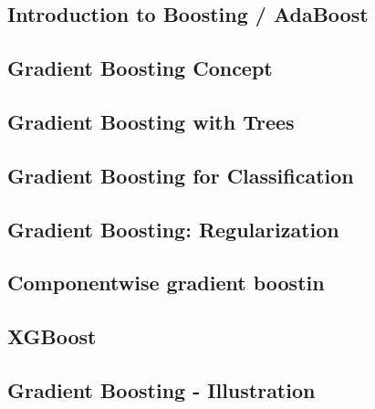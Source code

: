 


\subsection{Introduction to Boosting / AdaBoost}


\subsection{Gradient Boosting Concept}



\subsection{Gradient Boosting with Trees}



\subsection{Gradient Boosting for Classification}



\subsection{Gradient Boosting: Regularization}



\subsection{Componentwise gradient boostin}



\subsection{XGBoost}



\subsection{Gradient Boosting - Illustration}




